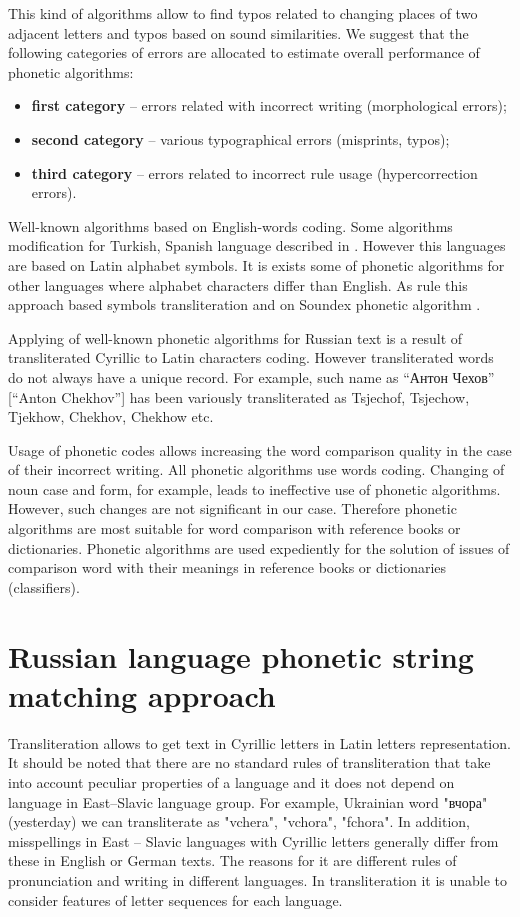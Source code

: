 \documentclass[conference,a4paper]{IEEEtran}
\begin{document}
This kind of algorithms allow to find typos related to changing places of two adjacent letters and typos based on sound similarities. We suggest that the following categories of errors are allocated to estimate overall performance of phonetic algorithms:
\begin{itemize}
\item \textbf{first category} – errors related with incorrect writing (morphological errors);
\item \textbf{second category} – various typographical errors (misprints, typos);
\item \textbf{third category} – errors related to incorrect rule usage (hypercorrection \cite{Parubchenko-2005} errors).
\end{itemize}

Well-known algorithms based on English-words coding. Some algorithms modification for Turkish, Spanish language described in \cite{Alotaibi-2013}. However this languages are based on Latin alphabet symbols. It is exists some of phonetic algorithms for other languages where alphabet characters differ than English. As rule this approach based symbols transliteration and on Soundex phonetic algorithm \cite{Soundex}.

Applying of well-known phonetic algorithms for Russian text is a result of transliterated Cyrillic to Latin characters coding. However transliterated words do not always have a unique record. For example, such name as “Антон Чехов” [“Anton Chekhov”] has been variously transliterated as Tsjechof, Tsjechow, Tjekhow, Chekhov, Chekhow etc.

Usage of phonetic codes allows increasing the word comparison quality in the case of their incorrect writing. All phonetic algorithms use words coding. Changing of noun case and form, for example, leads to ineffective use of phonetic algorithms. However, such changes are not significant in our case. Therefore phonetic algorithms are most suitable for word comparison with reference books or dictionaries. Phonetic algorithms are used expediently for the solution of issues of comparison word with their meanings in reference books or dictionaries (classifiers).

\section{Russian language phonetic string matching approach}
Transliteration allows to get text in Cyrillic letters in Latin letters representation. It should be noted that there are no standard rules of transliteration that take into account peculiar properties of a language and it does not depend on language in East--Slavic language group. For example, Ukrainian word "вчора" (yesterday) we can transliterate as "vchera", "vchora", "fchora". In addition, misspellings in East – Slavic languages with Cyrillic letters generally differ from these in English or German texts. The reasons for it are different rules of pronunciation and writing in different languages. In transliteration it is unable to consider features of letter sequences for each language.
\end{document}

